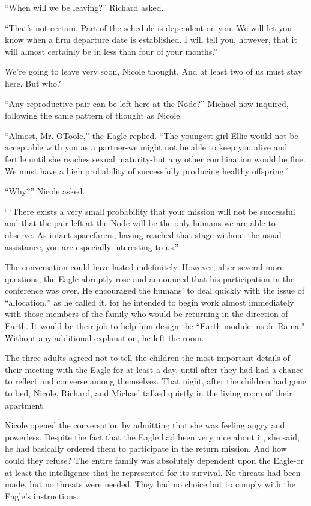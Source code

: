 \documentclass[]{article}
\begin{document}
{“When will we be leaving?” Richard asked.

“That’s not certain.  Part of the schedule is dependent on you.  We will let you know when a firm departure date is established.  I will tell you, however, that it will almost certainly be in less than four of your months.”

We’re going to leave very soon, Nicole thought.  And at least two of us must stay here.  But who?

“Any reproductive pair can be left here at the Node?” Michael now inquired, following the same pattern of thought as Nicole.

“Almost, Mr.  OToole,” the Eagle replied.  “The youngest girl Ellie would not be acceptable with you as a partner-we might not be able to keep you alive and fertile until she reaches sexual maturity-but any other combination would be fine.  We must have a high probability of successfully producing healthy offspring.”

“Why?” Nicole asked.

‘ ‘There exists a very small probability that your mission will not be successful and that the pair left at the Node will be the only humans we are able to observe.  As infant spacefarers, having reached that stage without the usual assistance, you are especially interesting to us.”

The conversation could have lasted indefinitely.  However, after several more questions, the Eagle abruptly rose and announced that his participation in the conference was over.  He encouraged the humans’ to deal quickly with the issue of “allocation,” as he called it, for he intended to begin work almost immediately with those members of the family who would be returning in the direction of Earth.  It would be their job to help him design the “Earth module inside Rama."  Without any additional explanation, he left the room.

The three adults agreed not to tell the children the most important details of their meeting with the Eagle for at least a day, until after they had had a chance to reflect and converse among themselves.  That night, after the children had gone to bed, Nicole, Richard, and Michael talked quietly in the living room of their apartment.

Nicole opened the conversation by admitting that she was feeling angry and powerless.  Despite the fact that the Eagle had been very nice about it, she said, he had basically ordered them to participate in the return mission.  And how could they refuse? The entire family was absolutely dependent upon the Eagle-or at least the intelligence that he represented-for its survival.  No threats had been made, but no threats were needed.  They had no choice but to comply with the Eagle’s instructions.

}
\end{document}
